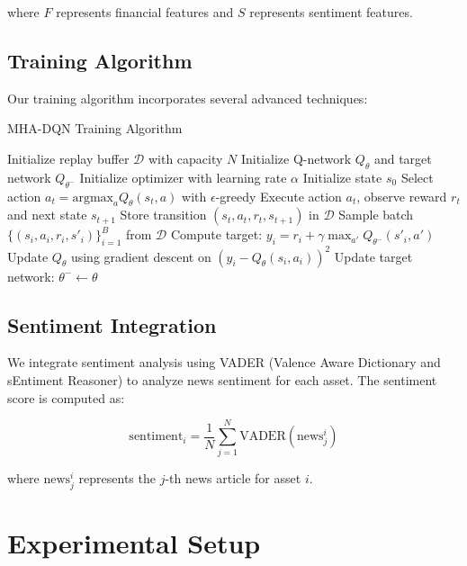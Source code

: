 \documentclass[11pt,twocolumn]{article}
\newcommand{\argmax}{\text{argmax}}
\theoremstyle{definition}
\begin{document}
where $F$ represents financial features and $S$ represents sentiment features.

\subsection{Training Algorithm}

Our training algorithm incorporates several advanced techniques:

\begin{algorithm}
\caption{MHA-DQN Training Algorithm}
\begin{algorithmic}[1]
\STATE Initialize replay buffer $\mathcal{D}$ with capacity $N$
\STATE Initialize Q-network $Q_\theta$ and target network $Q_{\theta^-}$
\STATE Initialize optimizer with learning rate $\alpha$
    \STATE Initialize state $s_0$
        \STATE Select action $a_t = \argmax_a Q_\theta(s_t, a)$ with $\epsilon$-greedy
        \STATE Execute action $a_t$, observe reward $r_t$ and next state $s_{t+1}$
        \STATE Store transition $(s_t, a_t, r_t, s_{t+1})$ in $\mathcal{D}$
            \STATE Sample batch $\{(s_i, a_i, r_i, s'_i)\}_{i=1}^B$ from $\mathcal{D}$
            \STATE Compute target: $y_i = r_i + \gamma \max_{a'} Q_{\theta^-}(s'_i, a')$
            \STATE Update $Q_\theta$ using gradient descent on $(y_i - Q_\theta(s_i, a_i))^2$
        \ENDIF
            \STATE Update target network: $\theta^- \leftarrow \theta$
        \ENDIF
    \ENDFOR
\ENDFOR
\end{algorithmic}
\end{algorithm}

\subsection{Sentiment Integration}

We integrate sentiment analysis using VADER (Valence Aware Dictionary and sEntiment Reasoner) \citep{hutto2014vader} to analyze news sentiment for each asset. The sentiment score is computed as:

\begin{equation}
\text{sentiment}_i = \frac{1}{N}\sum_{j=1}^N \text{VADER}(\text{news}_j^i)
\end{equation}

where $\text{news}_j^i$ represents the $j$-th news article for asset $i$.

\section{Experimental Setup}
\end{document}
